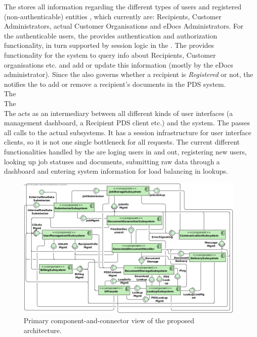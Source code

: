 The  stores all information regarding the different types of users and registered (non-authenticable) entities , which currently are: Recipients, Customer Administrators, actual Customer Organisations and eDocs Administrators. For the authenticable users, the  provides authentication and authorization functionality, in turn supported by session logic in the . The  provides functionality for the system to query info about Recipients, Customer organisations etc. and add or update this information (mostly by the eDocs administrator). Since the  also governs whether a recipient is \emph{Registered} or not, the  notifies the  to add or remove a recipient's documents in the PDS system.\\
The  \\
The  \\
The  acts as an intermediary between all different kinds of user interfaces (a management dashboard, a Recipient PDS client etc.) and the system. The  passes all calls to the actual subsystems. It has a session infrastructure for user interface clients, so it is not one single bottleneck for all requests. The current different functionalities handled by the  are loging users in and out, registering new users, looking up job statuses and documents, submitting raw data through a dashboard and entering system information for load balancing in lookups.\\

\begin{figure}[!htp]
    \centering
    \includegraphics[width=\textwidth]{figures/Subsystem Diagram.png}
    \caption{Primary component-and-connector view of the proposed architecture.}\label{fig:cs-primary}
\end{figure}

